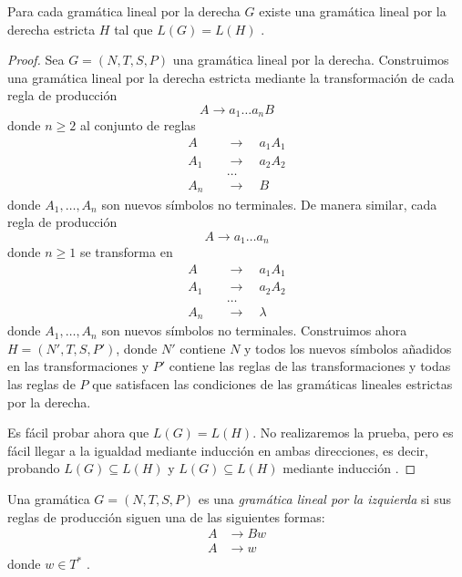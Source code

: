 \begin{lema}\label{lem:gld-glde}Para cada gramática lineal por la derecha $G$ existe una gramática lineal por la 
derecha estricta $H$ tal que $L(G)=L(H)$ \cite{pfenning_2000}.
\end{lema}
\begin{proof}
Sea $G=(N,T,S,P)$ una gramática lineal por la derecha. Construimos una gramática lineal por la derecha estricta
mediante la transformación de cada regla de producción
\begin{equation}
    A\to a_1\dots a_nB
\end{equation}
donde $n\geq 2$ al conjunto de reglas
\begin{align}
    A\quad&\to\quad a_1A_1 \\
    A_1\quad&\to\quad a_2A_2 \\
    &\dotsc \\
    A_n\quad&\to\quad B
\end{align}
donde $A_1,\dots,A_n$ son nuevos símbolos no terminales. De manera similar, cada regla de producción
\begin{equation}
    A\to a_1\dots a_n
\end{equation}
donde $n\geq 1$ se transforma en
\begin{align}
    A\quad&\to\quad a_1A_1 \\
    A_1\quad&\to\quad a_2A_2 \\
    &\dotsc \\
    A_n\quad&\to\quad\lambda
\end{align}
donde $A_1,\dots,A_n$ son nuevos símbolos no terminales.
Construimos ahora $H=(N',T,S,P')$, donde $N'$ contiene $N$ y todos los nuevos símbolos añadidos en las 
transformaciones y $P'$ contiene las reglas de las transformaciones y todas las reglas de $P$ que satisfacen las
condiciones de las gramáticas lineales estrictas por la derecha.

Es fácil probar ahora que $L(G)=L(H)$. No realizaremos la prueba, pero es fácil llegar a la igualdad mediante inducción
en ambas direcciones, es decir, probando $L(G)\subseteq L(H)$ y $L(G)\subseteq L(H)$ mediante inducción 
\cite{pfenning_2000}.
\end{proof}

\begin{definicion}\label{def:gramatica-li}Una gramática $G=(N,T,S,P)$ es una 
\textit{gramática lineal por la izquierda} si sus reglas de producción siguen una de las siguientes formas:
\begin{align*}
    A &\to Bw \\
    A &\to w
\end{align*}
donde $w\in T^*$ \cite{pfenning_2000}.
\end{definicion}

